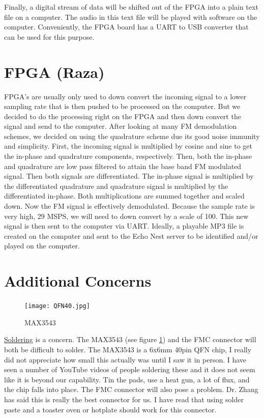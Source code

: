 \documentclass[a4paper, 12pt]{article}
\begin{document}
Finally, a digital stream of data will be shifted out of the FPGA into a plain text file on a computer.  The audio in this text file will be played with software on the computer.  Conveniently, the FPGA board has a UART to USB converter that can be used for this purpose.

\section{FPGA (Raza)}
FPGA’s are usually only used to down convert the incoming signal to a lower sampling rate that is then pushed to be processed on the computer. But we decided to do the processing right on the FPGA and then down convert the signal and send to the computer. After looking at many FM demodulation schemes, we decided on using the quadrature scheme due its good noise immunity and simplicity. First, the incoming signal is multiplied by cosine and sine to get the in-phase and quadrature components, respectively. Then, both the in-phase and quadrature are low pass filtered to attain the base band FM modulated signal. Then both signals are differentiated. The in-phase signal is multiplied by the differentiated quadrature and quadrature signal is multiplied by the differentiated in-phase. Both multiplications are summed together and scaled down. Now the FM signal is effectively demodulated. Because the sample rate is very high, 29 MSPS, we will need to down convert by a scale of 100. This new signal is then sent to the computer via UART. Ideally, a playable MP3 file is created on the computer and sent to the Echo Nest server to be identified and/or played on the computer.

\section{Additional Concerns}

\begin{figure}
\begin{center}
  \texttt{[image: QFN40.jpg]}
\end{center}

\caption{MAX3543}
\label{fig:qfn40}
\end{figure}

\underline{Soldering} is a concern.  The MAX3543 (see figure \ref{fig:qfn40}) and the FMC connector will both be difficult to solder.  The MAX3543 is a 6x6mm 40pin QFN chip, I really did not appreciate how small this actually was until I saw it in person.  I have seen a number of YouTube videos of people soldering these and it does not seem like it is beyond our capability.  Tin the pads, use a heat gun, a lot of flux, and the chip falls into place.  The FMC connector will also pose a problem.  Dr. Zhang has said this is really the best connector for us.  I have read that using solder paste and a toaster oven or hotplate should work for this connector.
\end{document}
